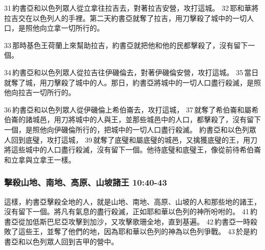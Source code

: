 31 約書亞和以色列眾人從立拿往拉吉去，對著拉吉安營，攻打這城。 32 耶和華將拉吉交在以色列人的手裡。第二天約書亞就奪了拉吉，用刀擊殺了城中的一切人口，是照他向立拿一切所行的。

33 那時基色王荷蘭上來幫助拉吉，約書亞就把他和他的民都擊殺了，沒有留下一個。

34 約書亞和以色列眾人從拉吉往伊磯倫去，對著伊磯倫安營，攻打這城。 35 當日就奪了城，用刀擊殺了城中的人。那日，約書亞將城中的一切人口盡行殺滅，是照他向拉吉一切所行的。

36 約書亞和以色列眾人從伊磯倫上希伯崙去，攻打這城， 37 就奪了希伯崙和屬希伯崙的諸城邑，用刀將城中的人與王，並那些城邑中的人口，都擊殺了，沒有留下一個，是照他向伊磯倫所行的，把城中的一切人口盡行殺滅。
 約書亞和以色列眾人回到底璧，攻打這城， 39 就奪了底璧和屬底璧的城邑，又擒獲底璧的王，用刀將這些城中的人口盡行殺滅，沒有留下一個。他待底璧和底璧王，像從前待希伯崙和立拿與立拿王一樣。

\subsubsection{擊殺山地、南地、高原、山坡諸王 10:40-43}
這樣，約書亞擊殺全地的人，就是山地、南地、高原、山坡的人和那些地的諸王，沒有留下一個。將凡有氣息的盡行殺滅，正如耶和華以色列的神所吩咐的。 41 約書亞從加低斯巴尼亞攻擊到加沙，又攻擊歌珊全地，直到基遍。 42 約書亞一時殺敗了這些王，並奪了他們的地，因為耶和華以色列的神為以色列爭戰。 43 於是約書亞和以色列眾人回到吉甲的營中。
\sffamily{}  

